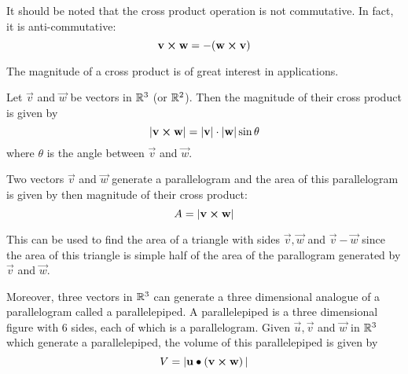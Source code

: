 \documentclass[handout]{ximera}
\begin{document}
It should be noted that the cross product operation is not commutative.  In fact, it is anti-commutative:
\[
\mathbf{v} \boldsymbol\times \mathbf{w} = -(\mathbf{w} \boldsymbol\times \mathbf{v})
\]

The magnitude of a cross product is of great interest in applications.
\begin{proposition}
Let $\vec{v}$ and $\vec{w}$ be vectors in $\mathbb R^3$ (or $\mathbb R^2$). Then the magnitude of their cross product is given by
\[
|\mathbf{v} \boldsymbol\times \mathbf{w}| = |\mathbf{v}| \cdot |\mathbf{w}| \sin \theta
\]
where $\theta$ is the angle between $\vec{v}$ and $\vec{w}$.
\end{proposition}

Two vectors $\vec{v}$ and $\vec{w}$ generate a parallelogram and the area of this parallelogram is given by then magnitude of their cross product:
\[
A = |\mathbf{v} \boldsymbol\times \mathbf{w}|
\]

\begin{image}
\end{image}

This can be used to find the area of a triangle with sides $\vec{v}, \vec{w}$ and $\vec{v}-\vec{w}$ since the area of this 
triangle is simple half of the area of the parallogram generated by $\vec{v}$ and $\vec{w}$.

\begin{image}
\end{image}


Moreover, three vectors in $\mathbb R^3$ can generate a three dimensional analogue of a parallelogram called a parallelepiped. 
A parallelepiped is a three dimensional figure with 6 sides, each of which is a parallelogram.
Given $\vec{u}, \vec{v}$ and $\vec{w}$
in $\mathbb R^3$ which generate a parallelepiped, the volume of this parallelepiped is given by
\[
V = |\mathbf{u} \bullet \left(\mathbf{v} \boldsymbol\times \mathbf{w}\right)|
\]
\end{document}
